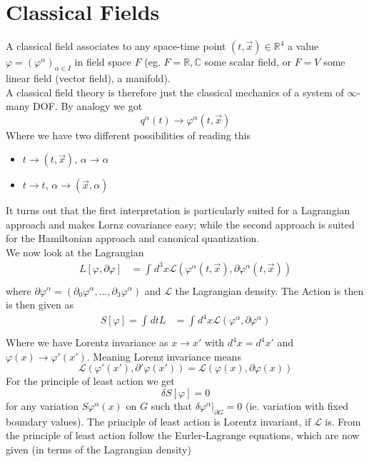 \documentclass{report}
\begin{document}
\section{Classical Fields}
A classical field associates to any space-time point $\left( t, \vec{x} \right) \in \mathbb{R}^{4} $ a value $\varphi = \left( \varphi^{\alpha}  \right)_{\alpha \in I} $ in field space $ F$ (eg. $F = \mathbb{R}, \mathbb{C}$ some scalar field, or $F = V$ some linear field (vector field), a manifold).\\
A classical field theory is therefore just the classical mechanics of a system of $\infty$-many DOF. By analogy we got \[
  q^{\alpha}( t ) \to \varphi^{\alpha} ( t, \vec{x} )
\] 
Where we have two different possibilities of reading this
\begin{itemize}
  \item $t \to \left( t, \vec{x} \right) $, $\alpha \to \alpha$ 
  \item $t\to t$, $\alpha \to \left( \vec{x}, \alpha \right) $
\end{itemize}
It turns out that the first interpretation is particularly suited for a Lagrangian approach and makes Lornz covariance easy; while the second approach is suited for the Hamiltonian approach and canonical quantization.\\
We now look at the Lagrangian 
\begin{align*}
  L\left[ \varphi, \partial \varphi  \right] &= \int_{}^{} d^3x \mathcal{L} \left( \varphi^{\alpha}( t, \vec{x} ), \partial \varphi^{\alpha} ( t, \vec{x} )  \right)   \\
\end{align*} where $\partial \varphi^{\alpha} = \left( \partial_0 \varphi^{\alpha} , \ldots, \partial_3 \varphi^{\alpha }   \right)  $ and $\mathcal{L}$ the Lagrangian density. The Action is then is then given as 
\begin{align*}
  S\left[ \varphi \right] = \int_{}^{} dt L &= \int_{}^{} d^{4} x \mathcal{L}\left( \varphi^{\alpha} , \partial \varphi^{\alpha}   \right)   \\ 
\end{align*}
Where we have Lorentz invariance as $x \to x'$ with $d^{4} x = d^{4} x'$ and $\varphi( x ) \to  \varphi'( x' )$. Meaning Lorenz invariance means \[
  \mathcal{L} \left( \varphi'( x' ), \partial' \varphi( x' )  \right) = \mathcal{L} \left( \varphi( x ), \partial \varphi( x )  \right) 
\] For the principle of least action we get \[
\delta S \left[ \varphi \right] = 0
\] for any variation $S \varphi^{\alpha} ( x )$ on $G$ such that $\delta \varphi^{\alpha}|_{\partial G } = 0$ (ie. variation with fixed boundary values). The principle of least action is Lorentz invariant, if $\mathcal{L} $ is. From the principle of least action follow the Eurler-Lagrange equations, which are now given (in terms of the Lagrangian density)
\end{document}
